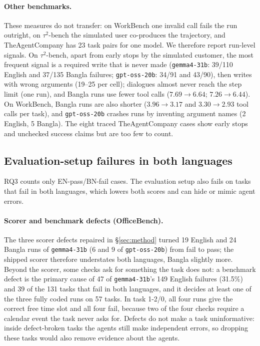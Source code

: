 \documentclass[11pt]{article}
\newcommand{\gemma}{\texttt{gemma4-31b}}
\newcommand{\gptoss}{\texttt{gpt-oss-20b}}
\newcommand{\OB}{OfficeBench}
\newcommand{\WB}{WorkBench}
\newcommand{\TAU}{$\tau^2$-bench}
\newcommand{\TAC}{TheAgentCompany}
\begin{document}
\paragraph{Other benchmarks.} These measures do not transfer: on \WB{} one invalid call fails the
run outright, on \TAU{} the simulated user co-produces the trajectory, and \TAC{} has 23 task pairs
for one model. We therefore report run-level signals. On \TAU{}, apart from early stops by the
simulated customer, the most frequent signal is a required write that is never made (\gemma{}:
39/110 English and 37/135 Bangla failures; \gptoss{}: 34/91 and 43/90), then writes with wrong
arguments (19--25 per cell); dialogues almost never reach the step limit (one run), and Bangla runs
use fewer tool calls ($7.69\to6.64$; $7.26\to6.44$). On \WB{}, Bangla runs are also shorter
($3.96\to3.17$ and $3.30\to2.93$ tool calls per task), and \gptoss{} crashes runs by inventing
argument names (2 English, 5 Bangla). The eight traced \TAC{} cases show early stops and unchecked
success claims but are too few to count.

\subsection{Evaluation-setup failures in both languages}
\label{sec:setup}

RQ3 counts only EN-pass/BN-fail cases. The evaluation setup also fails on tasks that fail in
both languages, which lowers both scores and can hide or mimic agent errors.

\paragraph{Scorer and benchmark defects (\OB{}).} The three scorer defects repaired in
\S\ref{sec:method} turned 19 English and 24 Bangla runs of \gemma{} (6 and 9 of \gptoss{}) from fail
to pass; the shipped scorer therefore understates both languages, Bangla slightly more. Beyond the
scorer, some checks ask for something the task does not: a benchmark defect is the primary cause of
47 of \gemma{}'s 149 English failures (31.5\%) and 39 of the 131 tasks that fail in both languages,
and it decides at least one of the three fully coded runs on 57 tasks. In task 1-2/0, all four runs
give the correct free time slot and all four fail, because two of the four checks require a
calendar event the task never asks for. Defects do not make a task uninformative: inside
defect-broken tasks the agents still make independent errors, so dropping these tasks would also
remove evidence about the agents.
\end{document}
